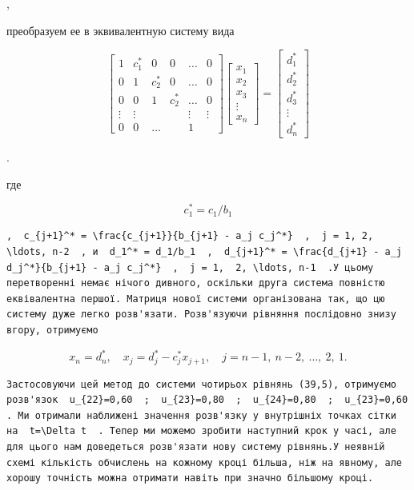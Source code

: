 \documentclass[
  ukrainian,
]{article}
\begin{document}
,

преобразуем ее в эквивалентную систему вида

\[
\begin{bmatrix} 1 & c_1^* & 0 & 0 & \dots & 0 \\ 0 & 1 & c_2^* & 0 & \dots & 0 \\ 0 & 0 & 1 & c_2^* & \dots & 0 \\ \vdots & \vdots & & & \vdots & \vdots \\ 0 & 0 & \dots & & 1 \end{bmatrix}
\begin{bmatrix} x_1 \\ x_2 \\ x_3 \\ \vdots \\ x_n \end{bmatrix}
=
\begin{bmatrix} d_1^* \\ d_2^* \\ d_3^* \\ \vdots \\ d_n^* \end{bmatrix}
\]

.

где

\[
c_1^* = c_1/b_1
\]

\begin{verbatim}
,  c_{j+1}^* = \frac{c_{j+1}}{b_{j+1} - a_j c_j^*}  ,  j = 1, 2, \ldots, n-2  , и  d_1^* = d_1/b_1  ,  d_{j+1}^* = \frac{d_{j+1} - a_j d_j^*}{b_{j+1} - a_j c_j^*}  ,  j = 1,  2, \ldots, n-1  .У цьому перетворенні немає нічого дивного, оскільки друга система повністю еквівалентна першої. Матриця нової системи організована так, що цю систему дуже легко розв'язати. Розв'язуючи рівняння послідовно знизу вгору, отримуємо
\end{verbatim}

\[
x_n = d_n^*, \quad x_j = d_j^* - c_j^* x_{j+1}, \quad j = n-1, \ n-2, \ \dots, \ 2, \ 1.
\]

\begin{verbatim}
Застосовуючи цей метод до системи чотирьох рівнянь (39,5), отримуємо розв'язок  u_{22}=0,60  ;  u_{23}=0,80  ;  u_{24}=0,80  ;  u_{23}=0,60  . Ми отримали наближені значення розв'язку у внутрішніх точках сітки на  t=\Delta t  . Тепер ми можемо зробити наступний крок у часі, але для цього нам доведеться розв'язати нову систему рівнянь.У неявній схемі кількість обчислень на кожному кроці більша, ніж на явному, але хорошу точність можна отримати навіть при значно більшому кроці.
\end{verbatim}
\end{document}
